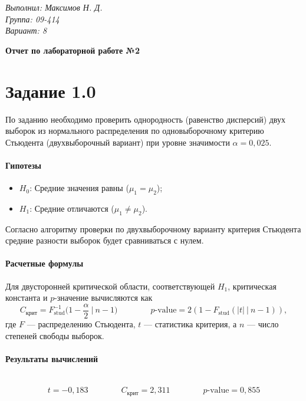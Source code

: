 \documentclass{article}
\begin{document}

\begin{flushright}
    \textit{Выполнил: Максимов Н. Д.} \\
    \textit{Группа: 09-414} \\
    \textit{Вариант: 8}
\end{flushright}

\begin{center}
    \bfseries\LARGE Отчет по лабораторной работе №2
\end{center}
\bigskip


\section*{Задание 1.0}
По заданию необходимо проверить однородность (равенство дисперсий) двух выборок из нормального распределения по одновыборочному критерию Стьюдента (двухвыборочный вариант) при уровне значимости $\alpha=0,025$.

\paragraph{Гипотезы}
\begin{itemize}[nosep]
    \item $H_0$: Средние значения равны ($\mu_1 = \mu_2$);
    \item $H_1$: Средние отличаются ($\mu_1 \neq \mu_2$).
\end{itemize}
Согласно алгоритму проверки по двухвыборочному варианту критерия Стьюдента средние разности выборок будет сравниваться с нулем.

\paragraph{Расчетные формулы} Для двусторонней критической области, соответствующей $H_1$, критическая константа и $p$-значение вычисляются как
\[ C_\text{крит} = F_\text{stud}^{-1} \Big(1-\frac\alpha2 ~\Big|~ n-1\Big) \qquad\qquad p\text{-value} = 2(1-F_\text{stud}(|t| ~|~ n-1)), \]
где $F$ --- распределению Стьюдента, $t$ --- статистика критерия, а $n$ --- число степеней свободы выборок.

\paragraph{Результаты вычислений} ~\vspace{-0.5\baselineskip}
\[ t = -0,183 \qquad\qquad C_\text{крит} = 2,311 \qquad\qquad p\text{-value} = 0,855 \]
\end{document}
